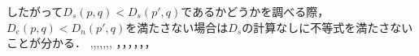したがって$D_s(p,q) < D_s(p',q)$であるかどうかを調べる際，$D_e(p,q) < D_n(p',q)$を満たさない場合は$D_s$の計算なしに不等式を満たさないことが分かる．
,,,,,,,
，，，，，，
